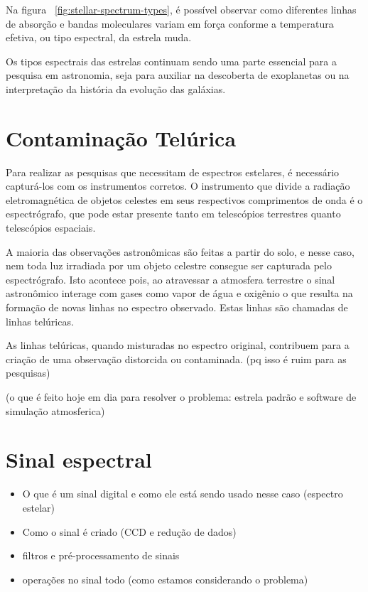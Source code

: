 Na figura ~\ref{fig:stellar-spectrum-types}, é possível observar como diferentes linhas de absorção e bandas moleculares variam em força conforme a temperatura efetiva, ou tipo espectral, da estrela muda.

Os tipos espectrais das estrelas continuam sendo uma parte essencial para a pesquisa em astronomia, seja para auxiliar na descoberta de exoplanetas ou na interpretação da história da evolução das galáxias. 

\section{Contaminação Telúrica}

Para realizar as pesquisas que necessitam de espectros estelares, é necessário capturá-los com os instrumentos corretos. O instrumento que divide a radiação eletromagnética de objetos celestes em seus respectivos comprimentos de onda é o espectrógrafo, que pode estar presente tanto em telescópios terrestres quanto telescópios espaciais.

A maioria das observações astronômicas são feitas a partir do solo, e nesse caso, nem toda luz irradiada por um objeto celestre consegue ser capturada pelo espectrógrafo. Isto acontece pois, ao atravessar a atmosfera terrestre o sinal astronômico interage com gases como vapor de água e oxigênio o que resulta na formação de novas linhas no espectro observado. Estas linhas são chamadas de linhas telúricas.

As linhas telúricas, quando misturadas no espectro original, contribuem para a criação de uma observação distorcida ou contaminada. (pq isso é ruim para as pesquisas)

(o que é feito hoje em dia para resolver o problema: estrela padrão e software de simulação atmosferica)

\section{Sinal espectral}
\begin{itemize}
    \item O que é um sinal digital e como ele está sendo usado nesse caso (espectro estelar)
    \item Como o sinal é criado (CCD e redução de dados)
    \item filtros e pré-processamento de sinais
    \item operações no sinal todo (como estamos considerando o problema)
\end{itemize}


